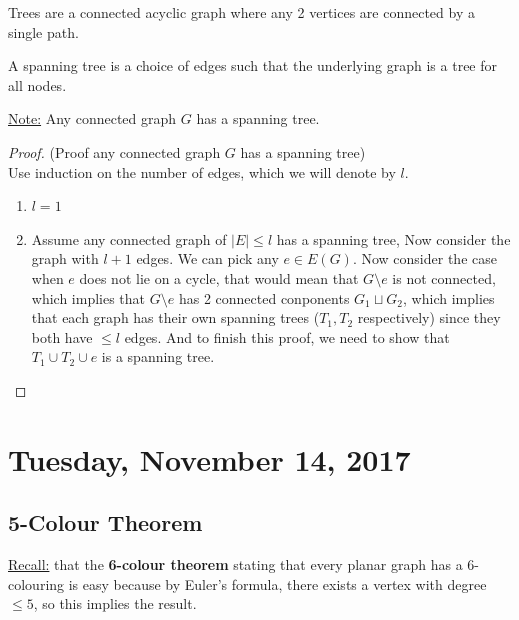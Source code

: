 \documentclass[12pt]{article}
\begin{document}
\begin{tcolorbox}[title=Definition:Trees]
	Trees are a connected acyclic graph where any 2 vertices are connected by a single path.
\end{tcolorbox}

\begin{tcolorbox}[title=Definition: Spanning Tree]
	A spanning tree is a choice of edges such that the underlying graph is a tree for all nodes.
\end{tcolorbox}

\underline{Note:} Any connected graph $G$ has a spanning tree.

\begin{proof}
	(Proof any connected graph $G$ has a spanning tree)\\
	Use induction on the number of edges, which we will denote by $l$.
	\begin{enumerate}
		\item{$l=1$}
		\item{Assume any connected graph of  $|E|\leq l$  has a spanning tree, Now consider the graph with $l+1$ edges. We can pick any $e\in E(G)$. Now consider the case when $e$ does not lie on a cycle, that would mean that $G \setminus e$ is not connected, which implies that $G \setminus e$ has 2 connected conponents $G_1 \sqcup G_2$, which implies that each graph has their own spanning trees ($T_1, T_2$ respectively) since they both have  $\leq l$ edges. And to finish this proof, we need to show that $T_1 \cup T_2 \cup e $ is a spanning tree.}
	\end{enumerate}
\end{proof}

\newpage

\section{Tuesday, November 14, 2017}

\subsection{5-Colour Theorem}

\begin{tcolorbox}
	\underline{Recall:} that the \textbf{6-colour theorem} stating that every planar graph has a 6-colouring is easy because by Euler's formula, there exists a vertex with degree $\leq 5$, so this implies the result.
\end{tcolorbox}
\end{document}
